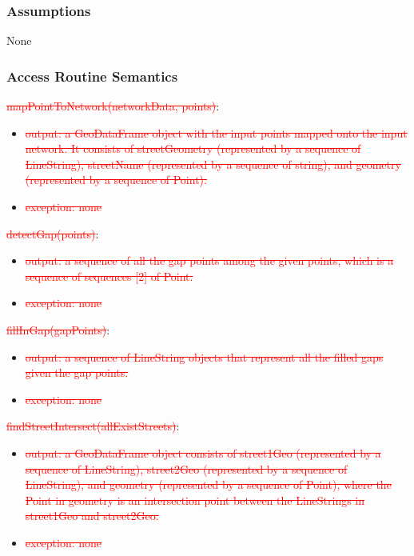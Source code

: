 \documentclass[12pt, titlepage]{article}
\begin{document}
\subsubsection{Assumptions}
None

\subsubsection{Access Routine Semantics}

\noindent \textcolor{red}{\sout{mapPointToNetwork(networkData, points)}}:
\begin{itemize}
\item \textcolor{red}{\sout{output: 
a GeoDataFrame object with the input points mapped onto the input network. It consists of streetGeometry (represented by a sequence of LineString), streetName (represented by a sequence of string), and geometry (represented by a sequence of Point).}}
\item \textcolor{red}{\sout{exception: none}}
\end{itemize}

\noindent \textcolor{red}{\sout{detectGap(points)}}:
\begin{itemize}
\item \textcolor{red}{\sout{output: a sequence of all the gap points among the given points, which is a sequence of sequences [2] of Point.}}
\item \textcolor{red}{\sout{exception: none}}
\end{itemize}

\noindent \textcolor{red}{\sout{fillInGap(gapPoints)}}:
\begin{itemize}
\item \textcolor{red}{\sout{output: a sequence of LineString objects that represent all the filled gaps given the gap points.}}
\item \textcolor{red}{\sout{exception: none}}
\end{itemize}

\noindent \textcolor{red}{\sout{findStreetIntersect(allExistStreets)}}:
\begin{itemize}
\item \textcolor{red}{\sout{output:  a GeoDataFrame object consists of street1Geo (represented by a sequence of LineString), street2Geo (represented by a sequence of LineString), and geometry (represented by a sequence of Point), where the Point in geometry is an intersection point between the LineStrings in street1Geo and street2Geo.}}
\item \textcolor{red}{\sout{exception: none}}
\end{itemize}
\end{document}
